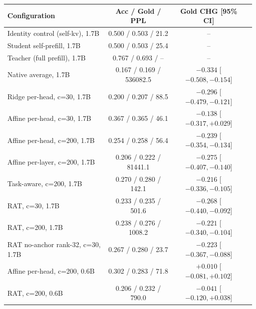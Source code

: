 \caption{Main audit results. Acc/gold/PPL: answer accuracy,
gold-letter probability, and perplexity of the scoring suffix for
the translated cache (kv-both). CHG is the gold-probability change
over the student's own prefill with 95\% bootstrap CIs. Pairs:
Qwen3-4B$\to$1.7B unless noted. All runs use disjoint
calibration/evaluation splits and the unified prompt format.}
\label{tab:main}
\small
\begin{tabular}{lccc}
\toprule
Configuration & Acc / Gold / PPL & Gold CHG [95\% CI] \\
\midrule
Identity control (self-kv), 1.7B & 0.500 / 0.503 / 21.2 & -- \\
Student self-prefill, 1.7B & 0.500 / 0.503 / 25.4 & -- \\
Teacher (full prefill), 1.7B & 0.767 / 0.693 / -- & -- \\
Native average, 1.7B & 0.167 / 0.169 / 536082.5 & $-0.334$ [$-0.508, -0.154$] \\
Ridge per-head, c=30, 1.7B & 0.200 / 0.207 / 88.5 & $-0.296$ [$-0.479, -0.121$] \\
Affine per-head, c=30, 1.7B & 0.367 / 0.365 / 46.1 & $-0.138$ [$-0.317, +0.029$] \\
Affine per-head, c=200, 1.7B & 0.254 / 0.258 / 56.4 & $-0.239$ [$-0.354, -0.134$] \\
Affine per-layer, c=200, 1.7B & 0.206 / 0.222 / 81441.1 & $-0.275$ [$-0.407, -0.140$] \\
Task-aware, c=200, 1.7B & 0.270 / 0.280 / 142.1 & $-0.216$ [$-0.336, -0.105$] \\
RAT, c=30, 1.7B & 0.233 / 0.235 / 501.6 & $-0.268$ [$-0.440, -0.092$] \\
RAT, c=200, 1.7B & 0.238 / 0.276 / 1008.2 & $-0.221$ [$-0.340, -0.104$] \\
RAT no-anchor rank-32, c=30, 1.7B & 0.267 / 0.280 / 23.7 & $-0.223$ [$-0.367, -0.088$] \\
Affine per-head, c=200, 0.6B & 0.302 / 0.283 / 71.8 & $+0.010$ [$-0.081, +0.102$] \\
RAT, c=200, 0.6B & 0.206 / 0.232 / 790.0 & $-0.041$ [$-0.120, +0.038$] \\
\bottomrule
\end{tabular}
